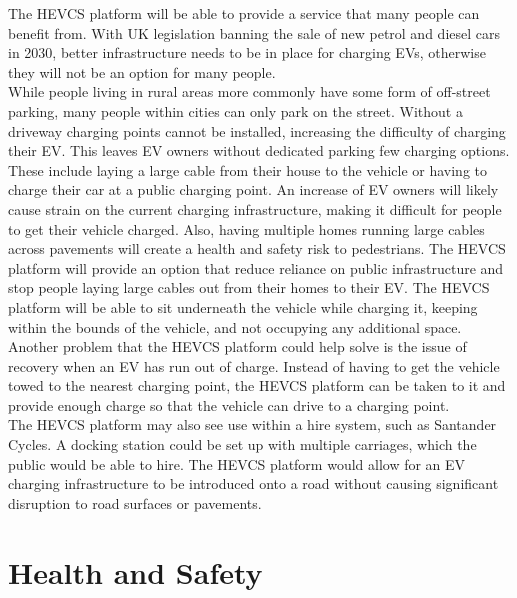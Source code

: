 \documentclass [12pt]{article}
\begin{document}
The HEVCS platform will be able to provide a service that many people can benefit from. With UK legislation banning the sale of new petrol and diesel cars in 2030, better infrastructure needs to be in place for charging EVs, otherwise they will not be an option for many people.
\\
While people living in rural areas more commonly have some form of off-street parking, many people within cities can only park on the street. Without a driveway charging points cannot be installed, increasing the difficulty of charging their EV. This leaves EV owners without dedicated parking few charging options. These include laying a large cable from their house to the vehicle or having to charge their car at a public charging point. An increase of EV owners will likely cause strain on the current charging infrastructure, making it difficult for people to get their vehicle charged. Also, having multiple homes running large cables across pavements will create a health and safety risk to pedestrians. The HEVCS platform will provide an option that reduce reliance on public infrastructure and stop people laying large cables out from their homes to their EV.  The HEVCS platform will be able to sit underneath the vehicle while charging it, keeping within the bounds of the vehicle, and not occupying any additional space.
\\
Another problem that the HEVCS platform could help solve is the issue of recovery when an EV has run out of charge. Instead of having to get the vehicle towed to the nearest charging point, the HEVCS platform can be taken to it and provide enough charge so that the vehicle can drive to a charging point.
\\
The HEVCS platform may also see use within a hire system, such as Santander Cycles. A docking station could be set up with multiple carriages, which the public would be able to hire. The HEVCS platform would allow for an EV charging infrastructure to be introduced onto a road without causing significant disruption to road surfaces or pavements.







\section{Health and Safety}\label{sec:health_and_safety}
\end{document}
